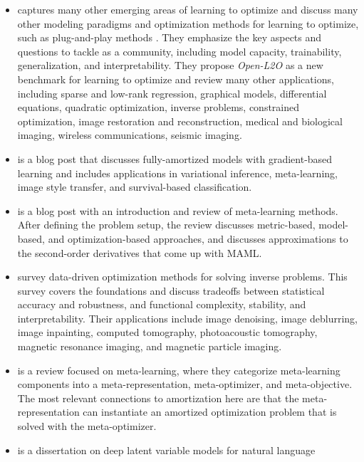\documentclass[twoside,11pt]{article}
\begin{document}
\begin{itemize}
\item \citet{chen2021learning} captures many other emerging areas
  of learning to optimize and discuss many other modeling paradigms
  and optimization methods for learning to optimize, such as
  plug-and-play methods \citep{venkatakrishnan2013plug,meinhardt2017learning,rick2017one,zhang2017learning}.
  They emphasize the key aspects and questions to tackle as a community,
  including model capacity, trainability, generalization, and
  interpretability.
  They propose \emph{Open-L2O} as a new benchmark for
  learning to optimize and review many other applications,
  including sparse and low-rank regression, graphical models,
  differential equations, quadratic optimization, inverse problems,
  constrained optimization, image restoration and reconstruction,
  medical and biological imaging, wireless communications,
  seismic imaging.
\item \citet{shu2017amortized} is a blog post that discusses
  fully-amortized models with gradient-based learning
  and includes applications in variational inference,
  meta-learning, image style transfer,
  and survival-based classification.
\item \citet{weng2018metalearning} is a blog post
  with an introduction and review of meta-learning methods.
  After defining the problem setup, the review discusses
  metric-based, model-based, and optimization-based approaches,
  and discusses approximations to the second-order derivatives
  that come up with MAML.
\item \citet{arridge2019solving} survey data-driven optimization
  methods for solving inverse problems.
  This survey covers the foundations and discuss
  tradeoffs between statistical accuracy and robustness, and
  functional complexity, stability, and interpretability.
  Their applications include image denoising, image deblurring,
  image inpainting, computed tomography,
  photoacoustic tomography, magnetic resonance imaging, and
  magnetic particle imaging.
\item \citet{hospedales2020meta} is a review focused on meta-learning,
  where they categorize meta-learning components into a
  meta-representation, meta-optimizer, and meta-objective.
  The most relevant connections to amortization here are that
  the meta-representation can instantiate an
  amortized optimization problem that is solved with the
  meta-optimizer.
\item \citet{kim2020deep} is a dissertation on deep
  latent variable models for natural language

\end{itemize}
\end{document}
